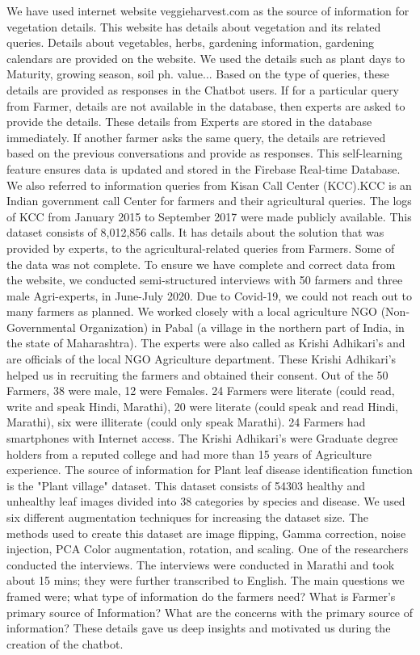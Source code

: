 \documentclass[10pt,conference]{IEEEtran}
\begin{document}
{\raggedright
We have used internet website veggieharvest.com as the source of information for vegetation details. This website has details about vegetation and its related queries. Details about vegetables, herbs, gardening information, gardening calendars are provided on the website. We used the details such as plant days to Maturity, growing season, soil ph. value... Based on the type of queries, these details are provided as responses in the Chatbot users. If for a particular query from Farmer, details are not available in the database, then experts are asked to provide the details. These details from Experts are stored in the database immediately. If another farmer asks the same query, the details are retrieved based on the previous conversations and provide as responses. This self-learning feature ensures data is updated and stored in the Firebase Real-time Database. We also referred to information queries from Kisan Call Center (KCC).KCC is an Indian government call Center for farmers and their agricultural queries. The logs of KCC from January 2015 to September 2017 were made publicly available. This dataset consists of 8,012,856 calls. It has details about the solution that was provided by experts, to the agricultural-related queries from Farmers.  Some of the data was not complete.\newline
To ensure we have complete and correct data from the website, we conducted semi-structured interviews with 50 farmers and three male Agri-experts, in June-July 2020. Due to Covid-19, we could not reach out to many farmers as planned. We worked closely with a local agriculture NGO (Non-Governmental Organization) in Pabal (a village in the northern part of India, in the state of Maharashtra). The experts were also called as Krishi Adhikari's and are officials of the local NGO Agriculture department. These Krishi Adhikari’s helped us in recruiting the farmers and obtained their consent. Out of the 50 Farmers, 38 were male, 12 were Females. 24 Farmers were literate (could read, write and speak Hindi, Marathi), 20 were literate (could speak and read Hindi, Marathi), six were illiterate (could only speak Marathi). 24 Farmers had smartphones with Internet access. The Krishi Adhikari's were Graduate degree holders from a reputed college and had more than 15 years of Agriculture experience.\newline
The source of information for Plant leaf disease identification function is the "Plant village" dataset. This dataset consists of 54303 healthy and unhealthy leaf images divided into 38 categories by species and disease. We used six different augmentation techniques for increasing the dataset size. The methods used to create this dataset are image flipping, Gamma correction, noise injection, PCA Color augmentation, rotation, and scaling. One of the researchers conducted the interviews. The interviews were conducted in Marathi and took about 15 mins; they were further transcribed to English. The main questions we framed were; what type of information do the farmers need?  What is Farmer’s primary source of Information? What are the concerns with the primary source of information? These details gave us deep insights and motivated us during the creation of the chatbot.
}
\newline
\newline
\end{document}
